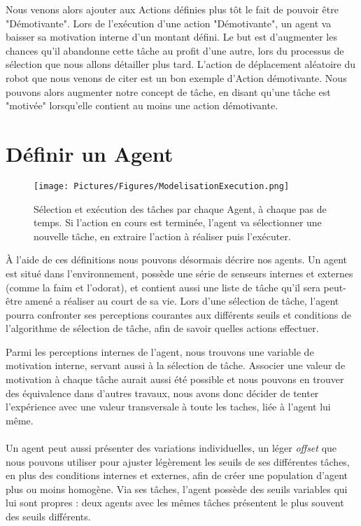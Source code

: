 \documentclass[11pt,a4paper]{report}
\begin{document}
			Nous venons alors ajouter aux Actions définies plus tôt le fait de pouvoir être "Démotivante". Lors de l'exécution d'une action "Démotivante", un agent va baisser sa motivation interne d'un montant défini. Le but est d'augmenter les chances qu'il abandonne cette tâche au profit d'une autre, lors du processus de sélection que nous allons détailler plus tard. L'action de déplacement aléatoire du robot que nous venons de citer est un bon exemple d'Action démotivante. Nous pouvons alors augmenter notre concept de tâche, en disant qu'une tâche est "motivée" lorsqu'elle contient au moins une action démotivante.
	
	\section{Définir un Agent}
	
	\begin{figure}
	\centering
	\texttt{[image: Pictures/Figures/ModelisationExecution.png]}
	\caption[Sélection et exécution des tâches par chaque Agent, à chaque pas de temps.]{Sélection et exécution des tâches par chaque Agent, à chaque pas de temps. Si l'action en cours est terminée, l'agent va sélectionner une nouvelle tâche, en extraire l'action à réaliser puis l'exécuter.}
	\label{agentExec}
	\end{figure}		
	
	
		À l'aide de ces définitions nous pouvons désormais décrire nos agents. Un agent est situé dans l'environnement, possède une série de senseurs internes et externes (comme la faim et l'odorat), et contient aussi une liste de tâche qu'il sera peut-être amené a réaliser au court de sa vie. Lors d'une sélection de tâche, l'agent pourra confronter ses perceptions courantes aux différents seuils et conditions de l'algorithme de sélection de tâche, afin de savoir quelles actions effectuer.
		
		Parmi les perceptions internes de l'agent, nous trouvons une variable de motivation interne, servant aussi à la sélection de tâche. Associer une valeur de motivation à chaque tâche aurait aussi été possible et nous pouvons en trouver des équivalence dans d'autres travaux, nous avons donc décider de tenter l'expérience avec une valeur transversale à toute les taches, liée à l'agent lui même.
		
		\paragraph{}
		Un agent peut aussi présenter des variations individuelles, un léger \textit{offset} que nous pouvons utiliser pour ajuster légèrement les seuils de ses différentes tâches, en plus des conditions internes et externes, afin de créer une population d'agent plus ou moins homogène. Via ses tâches, l'agent possède des seuils variables qui lui sont propres : deux agents avec les mêmes tâches présentent le plus souvent des seuils différents.
		
\end{document}
